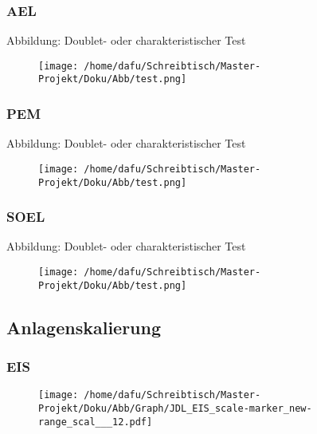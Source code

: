 \documentclass[onecolumn,10pt,titlepage]{article}
\begin{document}
\subsubsection*{AEL}
Abbildung: Doublet- oder charakteristischer Test
\begin{figure}[H]
	
	\centering
	\texttt{[image: /home/dafu/Schreibtisch/Master-Projekt/Doku/Abb/test.png]}
	\caption{ }
	\label{fig:doublet_AEL} 
\end{figure}
\subsubsection*{PEM}
Abbildung: Doublet- oder charakteristischer Test
\begin{figure}[H]
	
	\centering
	\texttt{[image: /home/dafu/Schreibtisch/Master-Projekt/Doku/Abb/test.png]}
	\caption{ }
	\label{fig:doublet_PEM} 
\end{figure}
\subsubsection*{SOEL}
Abbildung: Doublet- oder charakteristischer Test

\begin{figure}[h]
	
	\centering
	\texttt{[image: /home/dafu/Schreibtisch/Master-Projekt/Doku/Abb/test.png]}
	\caption{ }
	\label{fig:doublet_SOEL} 
\end{figure}

\subsection{Anlagenskalierung}
\subsubsection{EIS}
\begin{figure}[h]
	
	\centering
	\texttt{[image: /home/dafu/Schreibtisch/Master-Projekt/Doku/Abb/Graph/JDL\_EIS\_scale-marker\_new-range\_scal\_\_\_12.pdf]}
	\caption{ }
	\label{fig:Skal_EIS} 
\end{figure}
\end{document}
